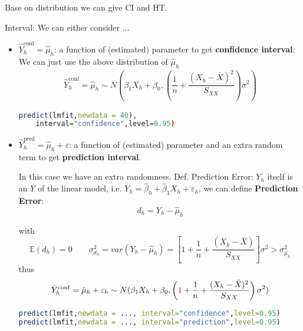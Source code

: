     Base on distribution we can give CI and HT.

\begin{point}
    Interval: We can either consider ...
\end{point}

    \begin{itemize}[topsep=2pt,itemsep=2pt]
        \item $ \hat{Y}_h^\mathrm{ conf } =\hat{\mu }_h $: a function of (estimated) parameter to get \textbf{confidence interval}: 
        We can just use the above distribution of $ \hat{\mu }_h $
        \begin{align}
            \hat{Y}_h^\mathrm{ conf }=\hat{\mu }_h\sim   N(\beta _1X_h+\beta _0,\left( \dfrac{1}{n}+\dfrac{(X_h-\bar{X})^2}{S_{XX}} \right)\sigma^2) 
        \end{align}
        
        

        \begin{rcode}
\begin{lstlisting}[language=R]
predict(lmfit,newdata = 40),
    interval="confidence",level=0.95)
\end{lstlisting}
        \end{rcode}
        \item $ \hat{Y}_h^\mathrm{ pred }=\hat{\mu }_h+\varepsilon   $: a function of (estimated) parameter and an extra random term to get \textbf{prediction interval}.

        In this case we have an extra randomness. Def. Prediction Error: $ Y_h $ itself is an $ Y $ of the linear model, i.e. $ Y_h=\hat{\beta}_0+\hat{\beta }_1X_h+\varepsilon _h $, we can define \textbf{Prediction Error}: 
        \begin{equation}
            d_h=Y_h-\hat{\mu}_h 
        \end{equation}
    
        with
        \begin{equation}
            \mathbb{E}(d_h)=0\qquad \sigma^2_{d_h}=var(Y_h-\hat{\mu }_h)=\left[ 1+\dfrac{1}{n}+\dfrac{(X_h-\bar{X})}{S_{XX}} \right]\sigma^2 > \sigma ^2_{\hat{\mu}_h}
        \end{equation}
        thus
        \begin{align}
            \hat{Y}_h^\mathrm{ conf }=\hat{\mu }_h+\varepsilon _h \sim   N(\beta _1X_h+\beta _0,\left( {\color{red}1}+\dfrac{1}{n}+\dfrac{(X_h-\bar{X})^2}{S_{XX}} \right)\sigma^2) 
        \end{align}
        

\begin{rcode}
\begin{lstlisting}[language=R]
predict(lmfit,newdata = ..., interval="confidence",level=0.95)
predict(lmfit,newdata = ..., interval="prediction",level=0.95)
\end{lstlisting}
\end{rcode}
    
    \end{itemize}

